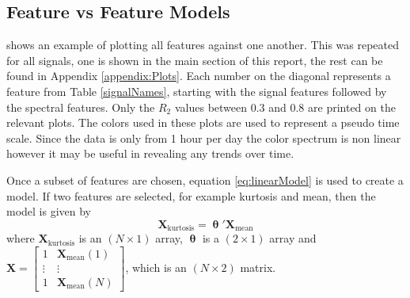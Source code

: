 \documentclass[]{article}
\begin{document}
\subsection{Feature vs Feature Models}
 shows an example of plotting all features against one another. This was repeated for all signals, one is shown in the main section of this report, the rest can be found in Appendix \ref{appendix:Plots}. Each number on the diagonal represents a feature from Table \ref{signalNames}, starting with the signal features followed by the spectral features. Only the $R_2$ values between 0.3 and 0.8 are printed on the relevant plots. The colors used in these plots are used to represent a pseudo time scale. Since the data is only from 1 hour per day the color spectrum is non linear however it may be useful in revealing any trends over time.

Once a subset of features are chosen, equation \ref{eq:linearModel} is used to create a model. If two features are selected, for example kurtosis and mean, then the model is given by
\begin{equation}
\mathbf{X}_{\textrm{kurtosis}} = \boldsymbol{\uptheta}'\mathbf{X}_{\textrm{mean}}
\end{equation}
where $\mathbf{X}_{\textrm{kurtosis}}$ is an $(N\times1)$ array, $\boldsymbol{\uptheta}$ is a $(2\times1)$ array and $\mathbf{X} = \begin{bmatrix} 1 & \mathbf{X}_{\textrm{mean}}(1) \\ \vdots & \vdots \\ 1 & \mathbf{X}_{\textrm{mean}}(N) \end{bmatrix}$, which is an $(N\times2)$ matrix. 
\end{document}
